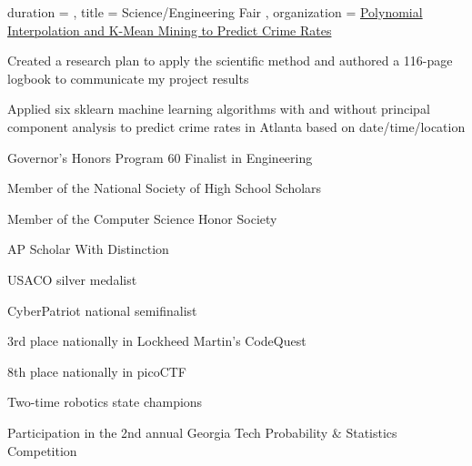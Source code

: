 \documentclass[sidebar-width=2.25in, primary=slate]{clean-resume}
\begin{document}
    \begin{experience}
      {
        duration = {  },
        title = { Science/Engineering Fair },
        organization = { \href{https://github.com/anishgoyal1108/Polynomial-Interpolation-and-K-Means-Crime-Prediction-Project}{Polynomial Interpolation and K-Mean Mining to Predict Crime Rates\phantom{aaaaaaaaaaaa}} }
      }
      \item Created a research plan to apply the scientific method and authored a 116-page logbook to communicate my project results
      \item Applied six sklearn machine learning algorithms with and without principal component analysis to predict crime rates in Atlanta based on date/time/location
    \end{experience}

    
    \begin{lst}
      \item Governor's Honors 
      Program 60 Finalist in Engineering
      \item Member of the National Society of High School Scholars
      \item Member of the Computer Science Honor Society
      \item AP Scholar With  Distinction
      \item USACO silver medalist
      \item CyberPatriot national semifinalist
      \item 3rd place nationally in Lockheed Martin's CodeQuest
      \item 8th place nationally in picoCTF
      \item Two-time robotics state champions
      \item Participation in the 2nd annual Georgia Tech Probability \& Statistics Competition
    \end{lst}
\end{document}

